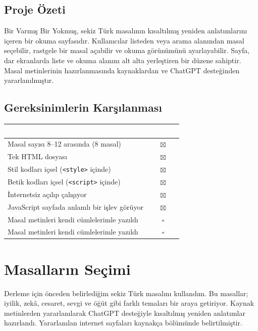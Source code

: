 \documentclass[12pt,a4paper]{article}
\begin{document}
\subsection{Proje Özeti}
Bir Varmış Bir Yokmuş, sekiz Türk masalının kısaltılmış yeniden anlatımlarını içeren bir okuma sayfasıdır. Kullanıcılar listeden veya arama alanından masal seçebilir, rastgele bir masal açabilir ve okuma görünümünü ayarlayabilir. Sayfa, dar ekranlarda liste ve okuma alanını alt alta yerleştiren bir düzene sahiptir. Masal metinlerinin hazırlanmasında kaynaklardan ve ChatGPT desteğinden yararlanılmıştır.

\subsection{Gereksinimlerin Karşılanması}
\begin{center}
\begin{tabular}{@{}p{8.2cm}c@{}}
\toprule
\rowcolor{ana}\textcolor{white}{\textbf{Gereksinim}} & \textcolor{white}{\textbf{Durum}} \\
\midrule
Masal sayısı 8--12 arasında (8 masal)         & $\boxtimes$ \\
Tek HTML dosyası                                    & $\boxtimes$ \\
Stil kodları içsel (\texttt{<style>} içinde)        & $\boxtimes$ \\
Betik kodları içsel (\texttt{<script>} içinde)      & $\boxtimes$ \\
İnternetsiz açılıp çalışıyor                        & $\boxtimes$ \\
JavaScript sayfada anlamlı bir işlev görüyor        & $\boxtimes$ \\
Masal metinleri kendi cümlelerimle yazıldı        & $\square$ \\
Masal metinleri kendi cümlelerimle yazıldı               & $\square$ \\
\bottomrule
\end{tabular}
\end{center}

\section{Masalların Seçimi}
Derleme için önceden belirlediğim sekiz Türk masalını kullandım. Bu masallar; iyilik, zekâ, cesaret, sevgi ve öğüt gibi farklı temaları bir araya getiriyor. Kaynak metinlerden yararlanılarak ChatGPT desteğiyle kısaltılmış yeniden anlatımlar hazırlandı. Yararlanılan internet sayfaları kaynakça bölümünde belirtilmiştir.
\end{document}
